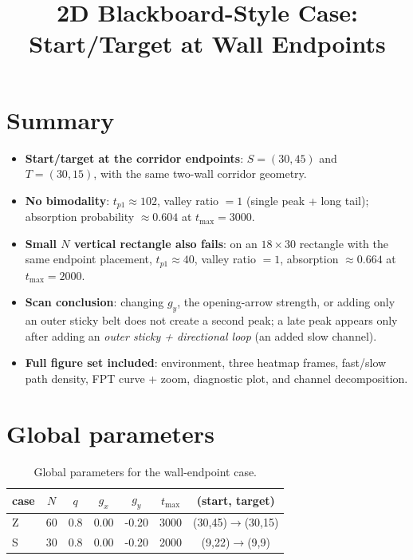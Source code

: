 \documentclass[11pt]{article}
\title{2D Blackboard-Style Case: Start/Target at Wall Endpoints}
\author{}
\date{}
\begin{document}
\sloppy
\maketitle

\section*{Summary}
\begin{itemize}
  \item \textbf{Start/target at the corridor endpoints}: $S=(30,45)$ and $T=(30,15)$, with the same two-wall corridor geometry.
  \item \textbf{No bimodality}: $t_{p1}\approx102$, valley ratio $=1$ (single peak + long tail); absorption probability $\approx0.604$ at $t_{\max}=3000$.
  \item \textbf{Small $N$ vertical rectangle also fails}: on an $18\times30$ rectangle with the same endpoint placement, $t_{p1}\approx40$, valley ratio $=1$, absorption $\approx0.664$ at $t_{\max}=2000$.
  \item \textbf{Scan conclusion}: changing $g_y$, the opening-arrow strength, or adding only an outer sticky belt does not create a second peak; a late peak appears only after adding an \emph{outer sticky + directional loop} (an added slow channel).
  \item \textbf{Full figure set included}: environment, three heatmap frames, fast/slow path density, FPT curve + zoom, diagnostic plot, and channel decomposition.
\end{itemize}

\section*{Global parameters}
\begin{table}[!htbp]
  \centering
  \begin{tabular}{lcccccc}
    \toprule
    case & $N$ & $q$ & $g_x$ & $g_y$ & $t_{\max}$ & (start, target) \\
    \midrule
    Z & 60 & 0.8 & 0.00 & -0.20 & 3000 & (30,45)$\to$(30,15) \\
    S & 30 & 0.8 & 0.00 & -0.20 & 2000 & (9,22)$\to$(9,9) \\
    \bottomrule
  \end{tabular}
  \caption{Global parameters for the wall-endpoint case.}
  \label{tab:params}
\end{table}
\end{document}
